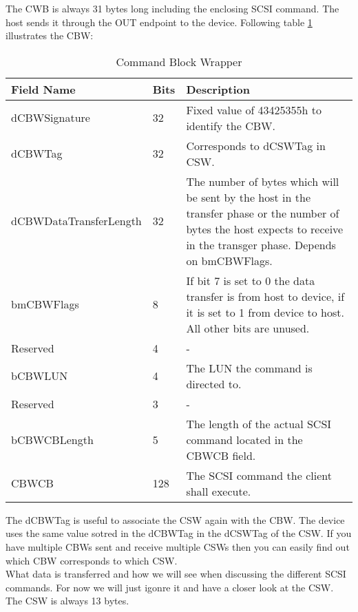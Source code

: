 The CWB is always 31 bytes long including the enclosing SCSI command. The host sends it through the OUT endpoint to the device. Following table \ref{table:cbw} illustrates the CBW:

\begin{table}[ht]
\caption{Command Block Wrapper}
\centering
\begin{tabular}{|l|l|p{9cm}|}
\hline\hline
\textbf{Field Name} & \textbf{Bits} & \textbf{Description}\\ \hline
dCBWSignature & 32 & Fixed value of 43425355h to identify the CBW. \\ \hline
dCBWTag & 32 & Corresponds to dCSWTag in CSW. \\ \hline
dCBWDataTransferLength & 32 & The number of bytes which will be sent by the host in the transfer phase or the number of bytes the host expects to receive in the transger phase. Depends on bmCBWFlags. \\ \hline
bmCBWFlags & 8 & If bit 7 is set to 0 the data transfer is from host to device, if it is set to 1 from device to host. All other bits are unused. \\ \hline
Reserved & 4 & - \\ \hline
bCBWLUN & 4 & The LUN the command is directed to. \\ \hline
Reserved & 3 & - \\ \hline
bCBWCBLength & 5 & The length of the actual SCSI command located in the CBWCB field. \\ \hline
CBWCB & 128 & The SCSI command the client shall execute. \\ \hline
\end{tabular}
\label{table:cbw}
\end{table}

The dCBWTag is useful to associate the CSW again with the CBW. The device uses the same value sotred in the dCBWTag in the dCSWTag of the CSW. If you have multiple CBWs sent and receive multiple CSWs then you can easily find out which CBW corresponds to which CSW.\\

What data is transferred and how we will see when discussing the different SCSI commands. For now we will just igonre it and have a closer look at the CSW. The CSW is always 13 bytes.

